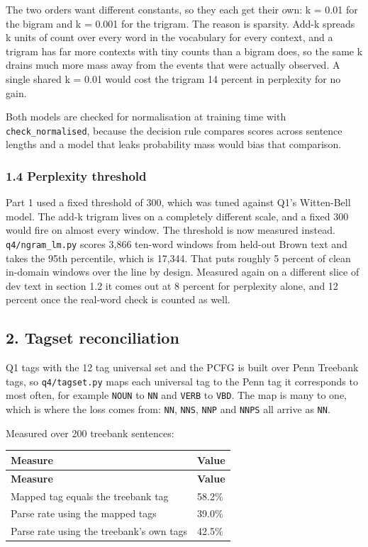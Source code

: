\documentclass[11pt,a4paper]{article}
\begin{document}
The two orders want different constants, so they each get their own: k = 0.01 for the bigram and k = 0.001 for the trigram. The reason is sparsity. Add-k spreads k units of count over every word in the vocabulary for every context, and a trigram has far more contexts with tiny counts than a bigram does, so the same k drains much more mass away from the events that were actually observed. A single shared k = 0.01 would cost the trigram 14 percent in perplexity for no gain.

Both models are checked for normalisation at training time with \texttt{check\_\allowbreak{}normalised}, because the decision rule compares scores across sentence lengths and a model that leaks probability mass would bias that comparison.

\subsubsection*{1.4 Perplexity threshold}

Part 1 used a fixed threshold of 300, which was tuned against Q1's Witten-Bell model. The add-k trigram lives on a completely different scale, and a fixed 300 would fire on almost every window. The threshold is now measured instead. \texttt{q4/\allowbreak{}ngram\_\allowbreak{}lm.\allowbreak{}py} scores 3,866 ten-word windows from held-out Brown text and takes the 95th percentile, which is 17,344. That puts roughly 5 percent of clean in-domain windows over the line by design. Measured again on a different slice of dev text in section 1.2 it comes out at 8 percent for perplexity alone, and 12 percent once the real-word check is counted as well.

\subsection*{2. Tagset reconciliation}

Q1 tags with the 12 tag universal set and the PCFG is built over Penn Treebank tags, so \texttt{q4/\allowbreak{}tagset.\allowbreak{}py} maps each universal tag to the Penn tag it corresponds to most often, for example \texttt{NOUN} to \texttt{NN} and \texttt{VERB} to \texttt{VBD}. The map is many to one, which is where the loss comes from: \texttt{NN}, \texttt{NNS}, \texttt{NNP} and \texttt{NNPS} all arrive as \texttt{NN}.

Measured over 200 treebank sentences:

{\small
\setlength{\tabcolsep}{4pt}
\begin{longtable}{ll}
\toprule
\textbf{Measure} & \textbf{Value} \\
\midrule
\endfirsthead
\toprule
\textbf{Measure} & \textbf{Value} \\
\midrule
\endhead
Mapped tag equals the treebank tag & 58.2\% \\
Parse rate using the mapped tags & 39.0\% \\
Parse rate using the treebank's own tags & 42.5\% \\
\bottomrule
\end{longtable}}
\end{document}
